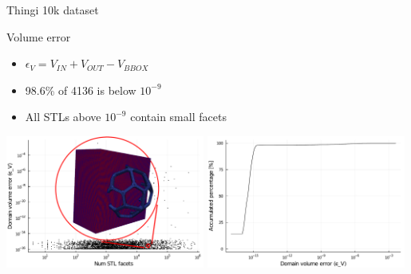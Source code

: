 \documentclass{beamer}
\begin{document}
\begin{frame}{Thingi 10k dataset}

  \begin{block}{Volume error}
  \begin{itemize}
    \item
      $\epsilon_V = V_{IN} + V_{OUT} - V_{BBOX}$
    \item
      98.6\% of 4136 is below $10^{-9}$
    \item
      All STLs above $10^{-9}$ contain small facets
  \end{itemize}
  \end{block}

  \includegraphics[width=0.49\textwidth]{num_stl_facets_volume_error_509317}
  \includegraphics[width=0.49\textwidth]{../analysis/plots/histogram_volume_error}
\end{frame}
\end{document}
